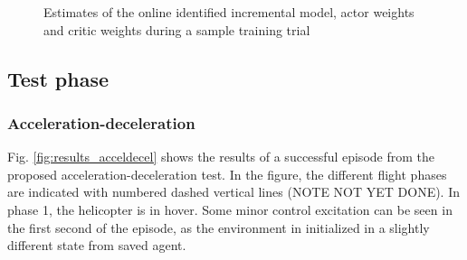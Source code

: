 \begin{figure}[htb]
    \centering
    \caption{Estimates of the online identified incremental model, actor weights and critic weights during a sample training trial}
    \label{fig:training_weights}
\end{figure}

\subsection{Test phase} \label{ssec:results:test}
\subsubsection{Acceleration-deceleration}
Fig. \ref{fig:results_acceldecel} shows the results of a successful episode from the proposed acceleration-deceleration test. In the figure, the different flight phases are indicated with numbered dashed vertical lines (NOTE NOT YET DONE). 
In phase 1, the helicopter is in hover. Some minor control excitation can be seen in the first second of the episode, as the environment in initialized in a slightly different state from saved agent. 


